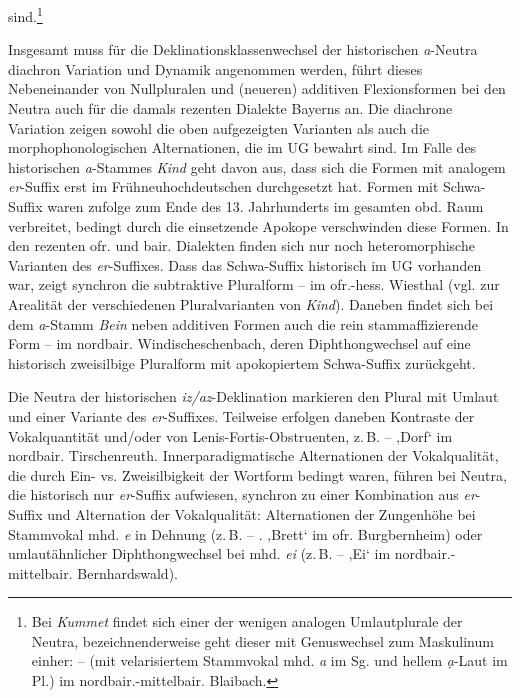 \begin{sloppypar}
sind.\footnote{Bei \textit{Kummet} findet sich einer der wenigen analogen Umlautplurale der Neutra, bezeichnenderweise geht dieser mit Genuswechsel zum Maskulinum einher:   --  (mit velarisiertem Stammvokal mhd. {\textit{a}} {im Sg. und} hellem \textit{ạ}{}-Laut im Pl.{) im nordbair.-mittelbair. Blaibach.}}
\end{sloppypar}

Insgesamt muss für die Deklinationsklassenwechsel der historischen \textit{a}{}-Neutra diachron Variation und Dynamik angenommen werden, \citet[§798]{Schmeller1821} führt dieses Nebeneinander von Nullpluralen und (neueren) additiven Flexionsformen bei den Neutra auch für die damals rezenten Dialekte Bayerns an. Die diachrone Variation zeigen sowohl die oben aufgezeigten Varianten als auch die morphophonologischen Alternationen, die im UG bewahrt sind. Im Falle des his\-to\-ri\-schen \textit{a}{}-Stammes \textit{Kind} geht \citet[118]{Birkenes2014} davon aus, dass sich die Formen mit analogem \textit{er}{}-Suffix erst im Frühneuhochdeutschen durchgesetzt hat. Formen mit Schwa-Suffix waren \citet[119]{Birkenes2014} zufolge zum Ende des 13. Jahrhunderts im gesamten obd. Raum verbreitet, bedingt durch die einsetzende Apokope verschwinden diese Formen. In den rezenten ofr. und bair. Dialekten finden sich nur noch heteromorphische Varianten des \textit{er}{}-Suffixes. Dass das Schwa-Suffix his\-to\-risch im UG vorhanden war, zeigt synchron die subtraktive Pluralform  --   im ofr.-hess. Wiesthal (vgl. \citealt[60--61]{Birkenes2014} zur Arealität der verschiedenen Pluralvarianten von \textit{Kind}). Daneben findet sich bei dem \textit{a}{}-Stamm \textit{Bein} neben additiven Formen auch die rein stammaffizierende Form  --  im nordbair. Windischeschenbach, deren Diphthongwechsel auf eine historisch zweisilbige Pluralform mit apokopiertem Schwa-Suffix zurückgeht.\largerpage

Die Neutra der historischen \textit{iz/az}-Deklination markieren den Plural mit Umlaut und einer Variante des \textit{er}{}-Suffixes. Teilweise erfolgen daneben Kontraste der Vokalquantität und/oder von Lenis-Fortis-Obstruenten, z.\,B.  --  ‚Dorf‘ im nordbair. Tirschenreuth. Innerparadigmatische Alternationen der Vokalqualität, die durch Ein- vs. Zweisilbigkeit der Wortform bedingt waren, führen bei Neutra, die historisch nur \textit{er}{}-Suffix aufwiesen, synchron zu einer Kombination aus \textit{er}{}-Suffix und Alternation der Vokalqualität: Alternationen der Zungenhöhe bei Stammvokal mhd. \textit{e} in Dehnung (z.\,B.  -- . ‚Brett‘ im ofr. Burgbernheim) oder umlautähnlicher Diphthongwechsel bei mhd. \textit{ei} (z.\,B.  --  ‚Ei‘ im nordbair.-mittelbair. Bernhardswald).

